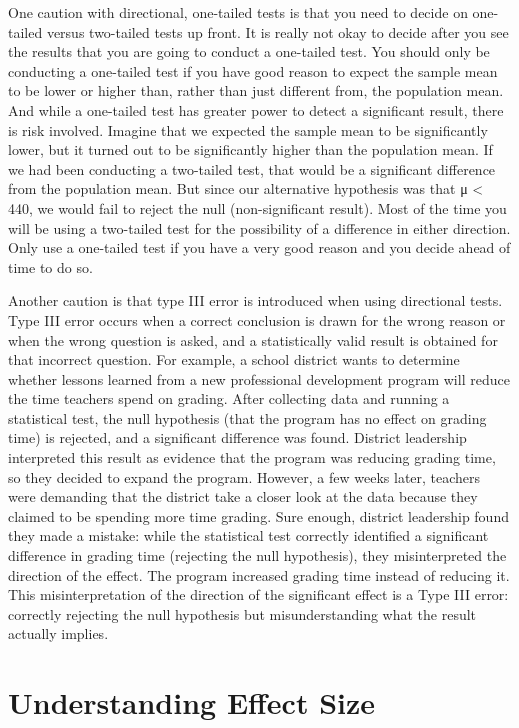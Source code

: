 \documentclass[
  letterpaper,
  DIV=11,
  numbers=noendperiod]{scrreprt}
\begin{document}
One caution with directional, one-tailed tests is that you need to
decide on one-tailed versus two-tailed tests up front. It is really not
okay to decide after you see the results that you are going to conduct a
one-tailed test. You should only be conducting a one-tailed test if you
have good reason to expect the sample mean to be lower or higher than,
rather than just different from, the population mean. And while a
one-tailed test has greater power to detect a significant result, there
is risk involved. Imagine that we expected the sample mean to be
significantly lower, but it turned out to be significantly higher than
the population mean. If we had been conducting a two-tailed test, that
would be a significant difference from the population mean. But since
our alternative hypothesis was that μ \textless{} 440, we would fail to
reject the null (non-significant result). Most of the time you will be
using a two-tailed test for the possibility of a difference in either
direction. Only use a one-tailed test if you have a very good reason and
you decide ahead of time to do so.

Another caution is that type III error is introduced when using
directional tests. Type III error occurs when a correct conclusion is
drawn for the wrong reason or when the wrong question is asked, and a
statistically valid result is obtained for that incorrect question. For
example, a school district wants to determine whether lessons learned
from a new professional development program will reduce the time
teachers spend on grading. After collecting data and running a
statistical test, the null hypothesis (that the program has no effect on
grading time) is rejected, and a significant difference was found.
District leadership interpreted this result as evidence that the program
was reducing grading time, so they decided to expand the program.
However, a few weeks later, teachers were demanding that the district
take a closer look at the data because they claimed to be spending more
time grading. Sure enough, district leadership found they made a
mistake: while the statistical test correctly identified a significant
difference in grading time (rejecting the null hypothesis), they
misinterpreted the direction of the effect. The program increased
grading time instead of reducing it. This misinterpretation of the
direction of the significant effect is a Type III error: correctly
rejecting the null hypothesis but misunderstanding what the result
actually implies.

\section{Understanding Effect Size}\label{understanding-effect-size}
\end{document}
